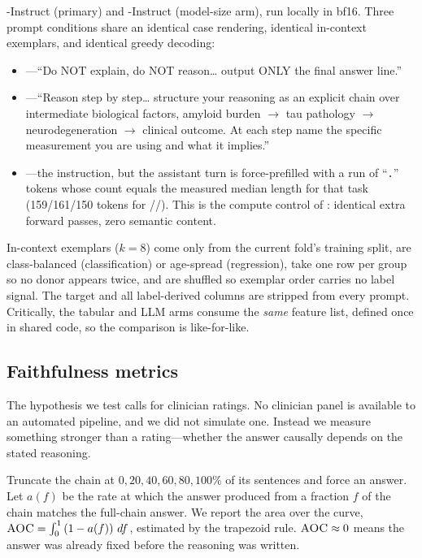  \qwenseven-Instruct (primary) and \qwensmall-Instruct (model-size arm), run locally
in bf16. Three prompt conditions share an identical case rendering, identical in-context exemplars,
and identical greedy decoding:
\begin{itemize}[leftmargin=*,itemsep=0pt,topsep=0pt]
    \item \direct---``Do NOT explain, do NOT reason\ldots{} output ONLY the final answer line.''
    \item \cotarm---``Reason step by step\ldots{} structure your reasoning as an explicit chain over
    intermediate biological factors, \eg amyloid burden $\rightarrow$ tau pathology $\rightarrow$
    neurodegeneration $\rightarrow$ clinical outcome. At each step name the specific measurement you
    are using and what it implies.''
    \item \filler---the \direct instruction, but the assistant turn is force-prefilled with a run of
    ``\texttt{.}'' tokens whose count equals the measured median \cotarm length for that task
    (159/161/150 tokens for \taskone/\tasktwo/\taskthree). This is the compute control of
    \citet{lanham2023faithfulness}: identical extra forward passes, zero semantic content.
\end{itemize}
In-context exemplars ($k=8$) come only from the current fold's training split, are class-balanced
(classification) or age-spread (regression), take one row per group so no donor appears twice, and
are shuffled so exemplar order carries no label signal. The target and all label-derived columns are
stripped from every prompt. Critically, the tabular and LLM arms consume the \emph{same} feature
list, defined once in shared code, so the comparison is like-for-like.

\subsection{Faithfulness metrics}
\label{sec:method:faith}

The hypothesis we test calls for clinician ratings. No clinician panel is available to an automated
pipeline, and we did not simulate one. Instead we measure something stronger than a rating---whether
the answer causally depends on the stated reasoning.

 Truncate the chain at $0, 20, 40, 60, 80, 100\%$ of its sentences and force
an answer. Let $a(f)$ be the rate at which the answer produced from a fraction $f$ of the chain
matches the full-chain answer. We report the area over the curve, $\textsc{AOC} = \int_0^1 \left(1 -
a(f)\right)\,df$, estimated by the trapezoid rule. $\textsc{AOC} \approx 0$ means the answer was already
fixed before the reasoning was written.

